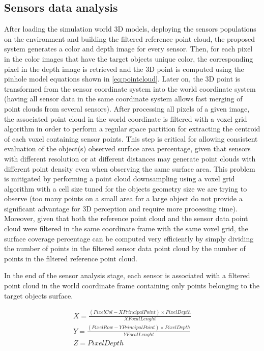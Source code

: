 \subsection{Sensors data analysis}

After loading the simulation world 3D models, deploying the sensors populations on the environment and building the filtered reference point cloud, the proposed system generates a color and depth image for every sensor. Then, for each pixel in the color images that have the target objects unique color, the corresponding pixel in the depth image is retrieved and the 3D point is computed using the pinhole model equations shown in \cref{eq:pointcloud}. Later on, the 3D point is transformed from the sensor coordinate system into the world coordinate system (having all sensor data in the same coordinate system allows fast merging of point clouds from several sensors). After processing all pixels of a given image, the associated point cloud in the world coordinate is filtered with a voxel grid algorithm in order to perform a regular space partition for extracting the centroid of each voxel containing sensor points. This step is critical for allowing consistent evaluation of the object(s) observed surface area percentage, given that sensors with different resolution or at different distances may generate point clouds with different point density even when observing the same surface area. This problem is mitigated by performing a point cloud downsampling using a voxel grid algorithm with a cell size tuned for the objects geometry size we are trying to observe (too many points on a small area for a large object do not provide a significant advantage for 3D perception and require more processing time). Moreover, given that both the reference point cloud and the sensor data point cloud were filtered in the same coordinate frame with the same voxel grid, the surface coverage percentage can be computed very efficiently by simply dividing the number of points in the filtered sensor data point cloud by the number of points in the filtered reference point cloud.

In the end of the sensor analysis stage, each sensor is associated with a filtered point cloud in the world coordinate frame containing only points belonging to the target objects surface.

\footnotesize
\begin{equation}\label{eq:pointcloud}
	\begin{split}
		X = \frac{(PixelCol - XPrincipalPoint) \times PixelDepth}{XFocalLenght}\\
		Y = \frac{(PixelRow - YPrincipalPoint) \times PixelDepth}{YFocalLenght}\\
		Z = PixelDepth
	\end{split}
\end{equation}
\normalsize

